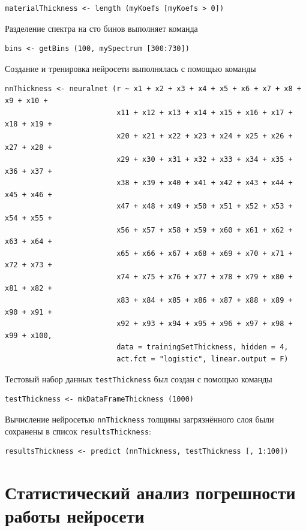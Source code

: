 \documentclass[12pt]{article}
\begin{document}
\begin{verbatim}
materialThickness <- length (myKoefs [myKoefs > 0])
\end{verbatim}

Разделение спектра на сто бинов выполняет команда

\begin{verbatim}
bins <- getBins (100, mySpectrum [300:730])
\end{verbatim}

Создание и тренировка нейросети выполнялась с помощью команды

\begin{verbatim}
nnThickness <- neuralnet (r ~ x1 + x2 + x3 + x4 + x5 + x6 + x7 + x8 + x9 + x10 + 
                          x11 + x12 + x13 + x14 + x15 + x16 + x17 + x18 + x19 +
                          x20 + x21 + x22 + x23 + x24 + x25 + x26 + x27 + x28 +
                          x29 + x30 + x31 + x32 + x33 + x34 + x35 + x36 + x37 +
                          x38 + x39 + x40 + x41 + x42 + x43 + x44 + x45 + x46 +
                          x47 + x48 + x49 + x50 + x51 + x52 + x53 + x54 + x55 +
                          x56 + x57 + x58 + x59 + x60 + x61 + x62 + x63 + x64 +
                          x65 + x66 + x67 + x68 + x69 + x70 + x71 + x72 + x73 +
                          x74 + x75 + x76 + x77 + x78 + x79 + x80 + x81 + x82 +
                          x83 + x84 + x85 + x86 + x87 + x88 + x89 + x90 + x91 +
                          x92 + x93 + x94 + x95 + x96 + x97 + x98 + x99 + x100,
                          data = trainingSetThickness, hidden = 4, 
                          act.fct = "logistic", linear.output = F)
\end{verbatim}

Тестовый набор данных \verb|testThickness| был создан с помощью команды

\begin{verbatim}
testThickness <- mkDataFrameThickness (1000)
\end{verbatim}

Вычисление нейросетью \verb|nnThickness| толщины загрязнённого слоя были сохранены в список \verb|resultsThickness|:

\begin{verbatim}
resultsThickness <- predict (nnThickness, testThickness [, 1:100])
\end{verbatim}

\section{Статистический анализ погрешности работы нейросети}
\end{document}
